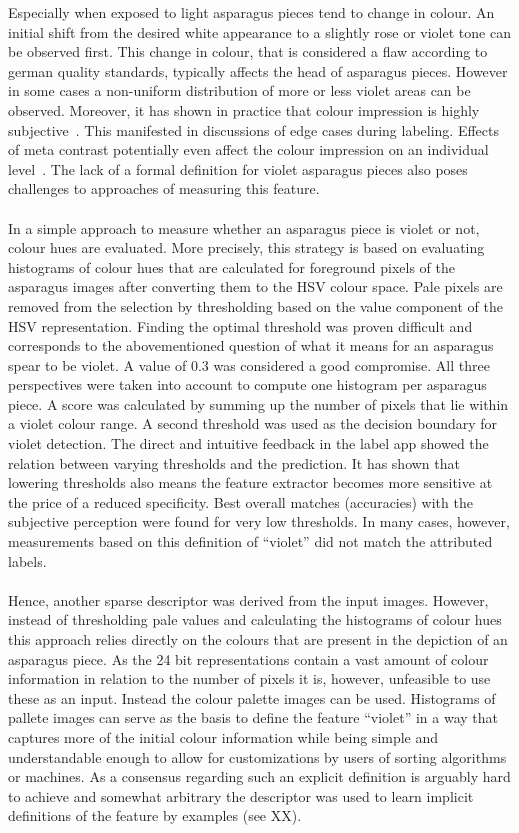 Especially when exposed to light asparagus pieces tend to change in colour. An initial shift from the desired white appearance to a slightly rose or violet tone can be observed first. This change in colour, that is considered a flaw according to german quality standards, typically affects the head of asparagus pieces. However in some cases a non-uniform distribution of more or less violet areas can be observed. Moreover, it has shown in practice that colour impression is highly subjective~\citep{luo2000review}. This manifested in discussions of edge cases during labeling. Effects of meta contrast potentially even affect the colour impression on an individual level~\citep{reeves1981metacontrast}. The lack of a formal definition for violet asparagus pieces also poses challenges to approaches of measuring this feature. \\
\\
In a simple approach to measure whether an asparagus piece is violet or not, colour hues are evaluated. More precisely, this strategy is based on evaluating histograms of colour hues that are calculated for foreground pixels of the asparagus images after converting them to the HSV colour space. Pale pixels are removed from the selection by thresholding based on the value component of the HSV representation. Finding the optimal threshold was proven difficult and corresponds to the abovementioned question of what it means for an asparagus spear to be violet. A value of 0.3 was considered a good compromise. All three perspectives were taken into account to compute one histogram per asparagus piece. A score was calculated by summing up the number of pixels that lie within a violet colour range. A second threshold was used as the decision boundary for violet detection. The direct and intuitive feedback in the label app showed the relation between varying thresholds and the prediction. It has shown that lowering thresholds also means the feature extractor becomes more sensitive at the price of a reduced specificity. Best overall matches (accuracies) with the subjective perception were found for very low thresholds. In many cases, however, measurements based on this definition of “violet” did not match the attributed labels. \\
\\
Hence, another sparse descriptor was derived from the input images. However, instead of thresholding pale values and calculating the histograms of colour hues this approach relies directly on the colours that are present in the depiction of an asparagus piece. As the 24 bit representations contain a vast amount of colour information in relation to the number of pixels it is, however, unfeasible to use these as an input. Instead the colour palette images can be used. Histograms of pallete images can serve as the basis to define the feature “violet” in a way that captures more of the initial colour information while being simple and understandable enough to allow for customizations by users of sorting algorithms or machines. As a consensus regarding such an explicit definition is arguably hard to achieve and somewhat arbitrary the descriptor was used to learn implicit definitions of the feature by examples (see XX). \\
